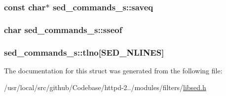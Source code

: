\subsubsection[{\texorpdfstring{saveq}{saveq}}]{\setlength{\rightskip}{0pt plus 5cm}const char$\ast$ sed\+\_\+commands\+\_\+s\+::saveq}\hypertarget{structsed__commands__s_a6f5734636a600caca08140c5ac72894b}{}\label{structsed__commands__s_a6f5734636a600caca08140c5ac72894b}
\subsubsection[{\texorpdfstring{sseof}{sseof}}]{\setlength{\rightskip}{0pt plus 5cm}char sed\+\_\+commands\+\_\+s\+::sseof}\hypertarget{structsed__commands__s_a1683933c16023facc26e394704e719df}{}\label{structsed__commands__s_a1683933c16023facc26e394704e719df}
\subsubsection[{\texorpdfstring{tlno}{tlno}}]{ sed\+\_\+commands\+\_\+s\+::tlno\mbox{[}{\bf S\+E\+D\+\_\+\+N\+L\+I\+N\+ES}\mbox{]}}\hypertarget{structsed__commands__s_a5ea0ca61ce862e1bec788e5ddeb36297}{}\label{structsed__commands__s_a5ea0ca61ce862e1bec788e5ddeb36297}


The documentation for this struct was generated from the following file\+:\begin{DoxyCompactItemize}
\item 
/usr/local/src/github/\+Codebase/httpd-\/2../modules/filters/\hyperlink{libsed_8h}{libsed.\+h}\end{DoxyCompactItemize}
